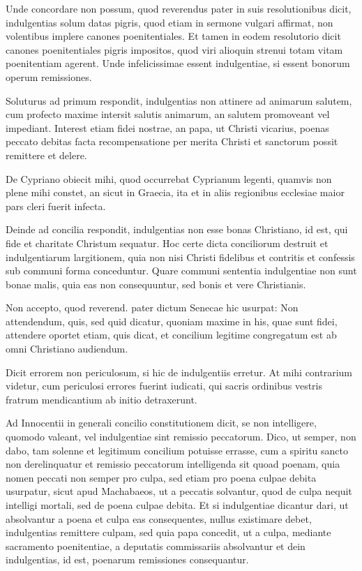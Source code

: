Unde concordare non possum, quod reverendus pater in suis resolutionibus dicit, indulgentias solum datas pigris, quod \marginpar{\small[350]} etiam in sermone vulgari affirmat, non volentibus implere canones poenitentiales. Et tamen in eodem resolutorio dicit canones poenitentiales pigris impositos, quod viri alioquin strenui totam vitam poenitentiam agerent. Unde infelicissimae essent indulgentiae, si essent bonorum operum remissiones.

Soluturus ad primum respondit, indulgentias non attinere ad animarum salutem, cum profecto maxime intersit salutis animarum, an salutem promoveant vel impediant. Interest etiam fidei nostrae, an papa, ut Christi vicarius, poenas peccato debitas facta recompensatione per merita Christi et sanctorum possit remittere et delere.

De Cypriano obiecit mihi, quod occurrebat Cyprianum legenti, quamvis non plene mihi constet, an sicut in Graecia, ita et in aliis regionibus ecclesiae maior pars cleri fuerit infecta.

Deinde ad concilia respondit, indulgentias non esse bonas Christiano, id est, qui fide et charitate Christum sequatur. Hoc certe dicta conciliorum destruit et indulgentiarum largitionem, quia non nisi Christi fidelibus et contritis et confessis sub communi forma conceduntur. Quare communi sententia indulgentiae non sunt bonae malis, quia eas non consequuntur, sed bonis et vere Christianis.

Non accepto, quod reverend. pater dictum Senecae hic usurpat: Non attendendum, quis, sed quid dicatur, quoniam maxime in his, quae sunt fidei, attendere oportet etiam, quis dicat, et concilium legitime congregatum est ab omni Christiano audiendum.

Dicit errorem non periculosum, si hic de indulgentiis erretur. At mihi contrarium videtur, cum periculosi errores fuerint iudicati, qui sacris ordinibus vestris fratrum mendicantium ab initio detraxerunt.

Ad Innocentii in generali concilio constitutionem dicit, se non intelligere, quomodo valeant, vel indulgentiae sint remissio peccatorum. Dico, ut semper, non dabo, tam solenne et legitimum concilium potuisse errasse, cum a spiritu sancto non derelinquatur et remissio peccatorum intelligenda sit quoad poenam, quia nomen peccati non semper pro culpa, sed etiam pro poena culpae debita usurpatur, sicut apud Machabaeos, ut a peccatis solvantur, quod de culpa nequit intelligi mortali, sed de poena culpae debita. Et si indulgentiae dicantur dari, ut absolvantur a poena et culpa eas consequentes, nullus existimare debet, indulgentias remittere culpam, sed quia papa concedit, ut a culpa, mediante sacramento poenitentiae, a deputatis commissariis absolvantur et dein indulgentias, id est, poenarum remissiones consequantur.

